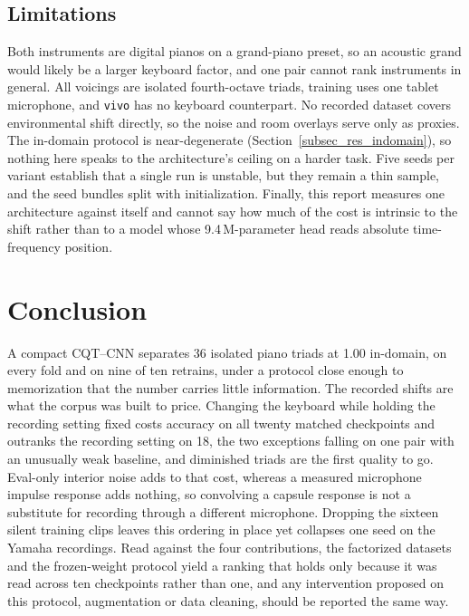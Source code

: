 \documentclass[pdflatex,sn-mathphys-num,iicol]{sn-jnl}
\begin{document}
\subsection{Limitations}\label{subsec_limitations}

Both instruments are digital pianos on a grand-piano preset, so an acoustic grand would likely be a larger keyboard factor, and one pair cannot rank instruments in general. All voicings are isolated fourth-octave triads, training uses one tablet microphone, and \texttt{vivo} has no keyboard counterpart. No recorded dataset covers environmental shift directly, so the noise and room overlays serve only as proxies. The in-domain protocol is near-degenerate (Section~\ref{subsec_res_indomain}), so nothing here speaks to the architecture's ceiling on a harder task. Five seeds per variant establish that a single run is unstable, but they remain a thin sample, and the seed bundles split with initialization. Finally, this report measures one architecture against itself and cannot say how much of the cost is intrinsic to the shift rather than to a model whose 9.4\,M-parameter head reads absolute time-frequency position.

\section{Conclusion}\label{sec_conclusion}

A compact CQT--CNN separates 36 isolated piano triads at 1.00 in-domain, on every fold and on nine of ten retrains, under a protocol close enough to memorization that the number carries little information. The recorded shifts are what the corpus was built to price. Changing the keyboard while holding the recording setting fixed costs accuracy on all twenty matched checkpoints and outranks the recording setting on 18, the two exceptions falling on one pair with an unusually weak baseline, and diminished triads are the first quality to go. Eval-only interior noise adds to that cost, whereas a measured microphone impulse response adds nothing, so convolving a capsule response is not a substitute for recording through a different microphone. Dropping the sixteen silent training clips leaves this ordering in place yet collapses one seed on the Yamaha recordings. Read against the four contributions, the factorized datasets and the frozen-weight protocol yield a ranking that holds only because it was read across ten checkpoints rather than one, and any intervention proposed on this protocol, augmentation or data cleaning, should be reported the same way.
\end{document}
